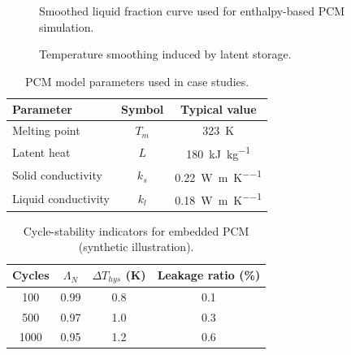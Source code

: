 \begin{figure}[htbp]
\centering
{}
\caption{Smoothed liquid fraction curve used for enthalpy-based PCM simulation.}
\label{fig:pcm_liquid_fraction}
\end{figure}

\begin{figure}[htbp]
\centering
{}
\caption{Temperature smoothing induced by latent storage.}
\label{fig:pcm_buffering_curve}
\end{figure}

\begin{table}[htbp]
\centering
\caption{PCM model parameters used in case studies.}
\label{tab:pcm_params}
\begin{tabular}{lcc}
\toprule
Parameter & Symbol & Typical value \\
\midrule
Melting point & $T_m$ & \SI{323}{\kelvin} \\
Latent heat & $L$ & \SI{180}{\kilo\joule\per\kilogram} \\
Solid conductivity & $k_s$ & \SI{0.22}{\watt\per\meter\per\kelvin} \\
Liquid conductivity & $k_l$ & \SI{0.18}{\watt\per\meter\per\kelvin} \\
\bottomrule
\end{tabular}
\end{table}

\begin{table}[htbp]
\centering
\caption{Cycle-stability indicators for embedded PCM (synthetic illustration).}
\label{tab:pcm_cycles}
\begin{tabular}{cccc}
\toprule
Cycles & $\Lambda_N$ & $\Delta T_{hys}$ (K) & Leakage ratio (\%) \\
\midrule
100 & 0.99 & 0.8 & 0.1 \\
500 & 0.97 & 1.0 & 0.3 \\
1000 & 0.95 & 1.2 & 0.6 \\
\bottomrule
\end{tabular}
\end{table}
